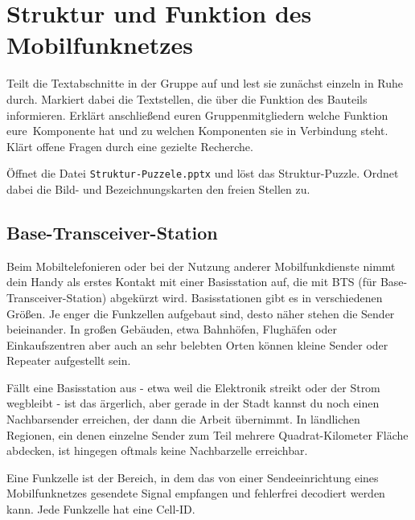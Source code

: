 \documentclass[loesung]{schulein}
\begin{document}
 
%
\section*{Struktur und Funktion des Mobilfunknetzes}
\begin{aufgaben}
\item Teilt die Textabschnitte in der Gruppe auf und lest sie zunächst einzeln in Ruhe durch. Markiert dabei die Textstellen, die über die Funktion des Bauteils informieren. Erklärt  anschließend euren Gruppenmitgliedern welche Funktion \glqq eure\grqq\ Komponente hat und zu welchen Komponenten sie in Verbindung steht. Klärt offene Fragen durch eine gezielte Recherche.
\item Öffnet die Datei \texttt{Struktur-Puzzele.pptx} und löst das Struktur-Puzzle. Ordnet dabei die Bild- und Bezeichnungskarten den freien Stellen zu. 

\end{aufgaben}
%
\subsection*{Base-Transceiver-Station}
Beim Mobiltelefonieren oder bei der Nutzung anderer Mobilfunkdienste nimmt dein Handy als erstes Kontakt mit einer Basisstation auf, die mit BTS (für Base-Transceiver-Station) abgekürzt wird. %
Basisstationen gibt es in verschiedenen \glqq Größen\grqq . Je enger die Funkzellen aufgebaut sind, desto näher stehen die Sender beieinander. In großen Gebäuden, etwa Bahnhöfen, Flughäfen oder Einkaufszentren aber auch an sehr belebten Orten können kleine Sender oder Repeater aufgestellt sein.

Fällt eine Basisstation aus - etwa weil die Elektronik streikt oder der Strom wegbleibt - ist das ärgerlich, aber gerade in der Stadt kannst du noch einen Nachbarsender erreichen, der dann die Arbeit übernimmt. In ländlichen Regionen, ein denen einzelne Sender zum Teil mehrere Quadrat-Kilometer Fläche abdecken, ist hingegen oftmals keine Nachbarzelle erreichbar.
 
Eine Funkzelle ist der Bereich, in dem das von einer Sendeeinrichtung eines Mobilfunknetzes gesendete Signal empfangen und fehlerfrei decodiert werden kann. Jede Funkzelle hat eine Cell-ID.
\end{document}
